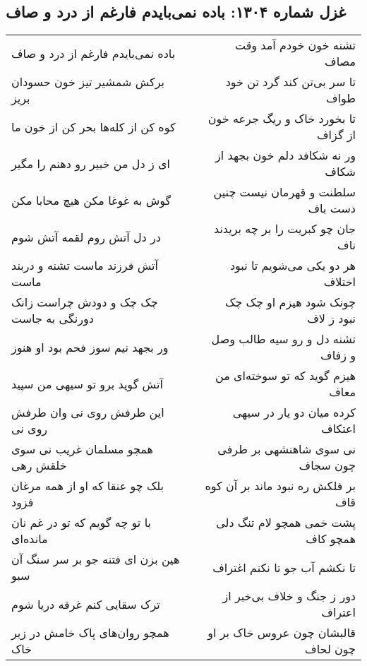 \begin{center}
\section*{غزل شماره ۱۳۰۴: باده نمی‌بایدم فارغم از درد و صاف}
\label{sec:1304}
\begin{longtable}{l p{0.5cm} r}
باده نمی‌بایدم فارغم از درد و صاف
&&
تشنه خون خودم آمد وقت مصاف
\\
برکش شمشیر تیز خون حسودان بریز
&&
تا سر بی‌تن کند گرد تن خود طواف
\\
کوه کن از کله‌ها بحر کن از خون ما
&&
تا بخورد خاک و ریگ جرعه خون از گزاف
\\
ای ز دل من خبیر رو دهنم را مگیر
&&
ور نه شکافد دلم خون بجهد از شکاف
\\
گوش به غوغا مکن هیچ محابا مکن
&&
سلطنت و قهرمان نیست چنین دست باف
\\
در دل آتش روم لقمه آتش شوم
&&
جان چو کبریت را بر چه بریدند ناف
\\
آتش فرزند ماست تشنه و دربند ماست
&&
هر دو یکی می‌شویم تا نبود اختلاف
\\
چک چک و دودش چراست زانک دورنگی به جاست
&&
چونک شود هیزم او چک چک نبود ز لاف
\\
ور بجهد نیم سوز فحم بود او هنوز
&&
تشنه دل و رو سیه طالب وصل و زفاف
\\
آتش گوید برو تو سیهی من سپید
&&
هیزم گوید که تو سوخته‌ای من معاف
\\
این طرفش روی نی وان طرفش روی نی
&&
کرده میان دو یار در سیهی اعتکاف
\\
همچو مسلمان غریب نی سوی خلقش رهی
&&
نی سوی شاهنشهی بر طرفی چون سجاف
\\
بلک چو عنقا که او از همه مرغان فزود
&&
بر فلکش ره نبود ماند بر آن کوه قاف
\\
با تو چه گویم که تو در غم نان مانده‌ای
&&
پشت خمی همچو لام تنگ دلی همچو کاف
\\
هین بزن ای فتنه جو بر سر سنگ آن سبو
&&
تا نکشم آب جو تا نکنم اغتراف
\\
ترک سقایی کنم غرقه دریا شوم
&&
دور ز جنگ و خلاف بی‌خبر از اعتراف
\\
همچو روان‌های پاک خامش در زیر خاک
&&
قالبشان چون عروس خاک بر او چون لحاف
\\
\end{longtable}
\end{center}
